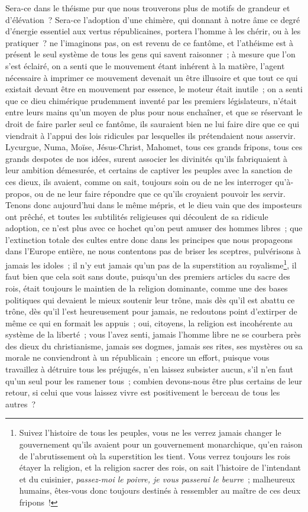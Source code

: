 \documentclass[french,twoside]{book} %
\begin{document}
Sera-ce dans le théisme pur que nous trouverons plus de motifs de grandeur et d’élévation ? Sera-ce l’adoption d’une chimère, qui donnant à notre âme ce degré d’énergie essentiel aux vertus républicaines, portera l’homme à les chérir, ou à les pratiquer ? ne l’imaginons pas, on est revenu de ce fantôme, et l’athéisme est à présent le seul système de tous les gens qui savent raisonner ; à mesure que l’on s’est éclairé, on a senti que le mouvement étant inhérent à la matière, l’agent nécessaire à imprimer ce mouvement devenait un être illusoire et que tout ce qui existait devant être en mouvement par essence, le moteur était inutile ; on a senti que ce dieu chimérique prudemment inventé par les premiers législateurs, n’était entre leurs mains qu’un moyen de plus pour nous enchaîner, et que se réservant le droit de faire parler seul ce fantôme, ils sauraient bien ne lui faire dire que ce qui viendrait à l’appui des lois ridicules par lesquelles ils prétendaient nous asservir. Lycurgue, Numa, Moïse, Jésus-Christ, Mahomet, tous ces grands fripons, tous ces grands despotes de nos idées, surent associer les divinités qu’ils fabriquaient à leur ambition démesurée, et certains de captiver les peuples avec la sanction de ces dieux, ils avaient, comme on sait, toujours soin ou de ne les interroger qu’à-propos, ou de ne leur faire répondre que ce qu’ils croyaient pouvoir les servir. Tenons donc aujourd’hui dans le même mépris, et le dieu vain que des imposteurs ont prêché, et toutes les subtilités religieuses qui découlent de sa ridicule adoption, ce n’est plus avec ce hochet qu’on peut amuser des hommes libres ; que l’extinction totale des cultes entre donc dans les principes que nous propageons dans l’Europe entière, ne nous contentons pas de briser les sceptres, pulvérisons à jamais les idoles ; il n’y eut jamais qu’un pas de la superstition au royalisme\footnote{ Suivez l’histoire de tous les peuples, vous ne les verrez jamais changer le gouvernement qu’ils avaient pour un gouvernement monarchique, qu’en raison de l’abrutissement où la superstition les tient. Vous verrez toujours les rois étayer la religion, et la religion sacrer des rois, on sait l’histoire de l’intendant et du cuisinier, {\itshape passez-moi le poivre, je vous passerai le beurre} ; malheureux humains, êtes-vous donc toujours destinés à ressembler au maître de ces deux fripons !}, il faut bien que cela soit sans doute, puisqu’un des premiers articles du sacre des rois, était toujours le maintien de la religion dominante, comme une des bases politiques qui devaient le mieux soutenir leur trône, mais dès qu’il est abattu ce trône, dès qu’il l’est heureusement pour jamais, ne redoutons point d’extirper de même ce qui en formait les appuis ; oui, citoyens, la religion est incohérente au système de la liberté ; vous l’avez senti, jamais l’homme libre ne se courbera près des dieux du christianisme, jamais ses dogmes, jamais ses rites, ses mystères ou sa morale ne conviendront à un républicain ; encore un effort, puisque vous travaillez à détruire tous les préjugés, n’en laissez subsister aucun, s’il n’en faut qu’un seul pour les ramener tous ; combien devons-nous être plus certains de leur retour, si celui que vous laissez vivre est positivement le berceau de tous les autres ?\par
\end{document}
